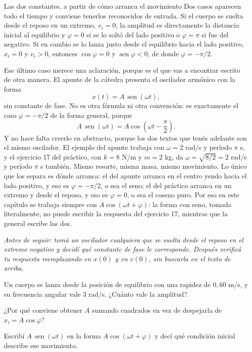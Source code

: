 \documentclass[11pt,openany]{book}
\newcommand{\sen}{\operatorname{sen}}
\begin{document}
\begin{bloque}{Las dos constantes, a partir de cómo arranca el movimiento}
Dos casos aparecen todo el tiempo y conviene tenerlos reconocidos de entrada. Si el cuerpo se suelta desde el reposo en un extremo, $v_i = 0$, la amplitud es directamente la distancia inicial al equilibrio y $\varphi = 0$ si se lo soltó del lado positivo o $\varphi = \pi$ si fue del negativo. Si en cambio se lo lanza justo desde el equilibrio hacia el lado positivo, $x_i = 0$ y $v_i > 0$, entonces $\cos\varphi = 0$ y $\sen\varphi < 0$, de donde $\varphi = -\pi/2$.

Ese último caso merece una aclaración, porque es el que vas a encontrar escrito de otra manera. El apunte de la cátedra presenta el oscilador armónico con la forma
\[
x(t) = A\,\sen(\omega t) ,
\]
sin constante de fase. No es otra fórmula ni otra convención: es exactamente el caso $\varphi = -\pi/2$ de la forma general, porque
\[
A\,\sen(\omega t) = A\cos\!\left(\omega t - \frac{\pi}{2}\right) .
\]
Y no hace falta creerlo en abstracto, porque los dos textos que tenés adelante son el mismo oscilador. El ejemplo del apunte trabaja con $\omega = 2$ rad/s y período $\pi$ s, y el ejercicio 17 del práctico, con $k = 8$ N/m y $m = 2$ kg, da $\omega = \sqrt{8/2} = 2$ rad/s y período $\pi$ s también. Mismo resorte, misma masa, mismo movimiento. Lo único que los separa es dónde arranca: el del apunte arranca en el centro yendo hacia el lado positivo, y eso es $\varphi = -\pi/2$, o sea el seno; el del práctico arranca en un extremo y desde el reposo, y eso es $\varphi = 0$, o sea el coseno puro. Por eso en este capítulo se trabaja siempre con $A\cos(\omega t+\varphi)$: la forma con seno, tomada literalmente, no puede escribir la respuesta del ejercicio 17, mientras que la general escribe las dos.

\textit{Antes de seguir: tomá un oscilador cualquiera que se suelta desde el reposo en el extremo negativo y decidí qué constante de fase le corresponde. Después verificá tu respuesta reemplazando en $x(0)$ y en $v(0)$, sin buscarla en el texto de arriba.}
\end{bloque}

\begin{chequeo}
\item Un cuerpo se lanza desde la posición de equilibrio con una rapidez de $0{,}60$ m/s, y su frecuencia angular vale 3 rad/s. ¿Cuánto vale la amplitud?
\item ¿Por qué conviene obtener $A$ sumando cuadrados en vez de despejarla de $x_i = A\cos\varphi$?
\item Escribí $A\,\sen(\omega t)$ en la forma $A\cos(\omega t+\varphi)$ y decí qué condición inicial describe ese movimiento.
\end{chequeo}
\end{document}
